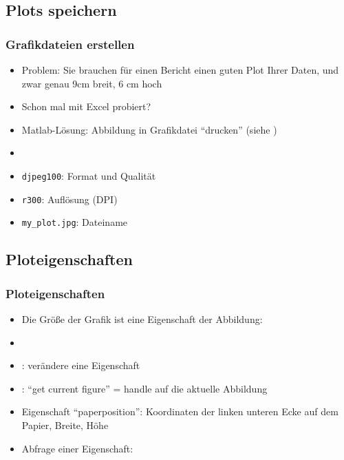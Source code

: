       \subsection{Plots speichern}
      \begin{frame}
          \frametitle{Grafikdateien erstellen}
          \begin{itemize}
              \item Problem: Sie brauchen für einen Bericht einen guten Plot Ihrer Daten, und zwar genau 9cm breit, 6 cm hoch
              \item Schon mal mit Excel probiert?
              \item Matlab-Lösung: Abbildung in Grafikdatei ``drucken'' (siehe )
              \item {}
              \item \texttt{djpeg100}: Format und Qualität
              \item \texttt{r300}: Auflösung (DPI)
              \item \texttt{my\_plot.jpg}: Dateiname
          \end{itemize}
      \end{frame}

      \subsection{Ploteigenschaften}
      \begin{frame}
          \frametitle{Ploteigenschaften}
          \begin{itemize}
              \item Die Größe der Grafik ist eine Eigenschaft der Abbildung:
              \item {} 
              \item {}: verändere eine Eigenschaft
              \item {}: ``get current figure'' = handle auf die aktuelle Abbildung
              \item Eigenschaft ``paperposition'': Koordinaten der linken unteren Ecke auf dem Papier, Breite, Höhe
              \item Abfrage einer Eigenschaft: 
          \end{itemize}
      \end{frame}

